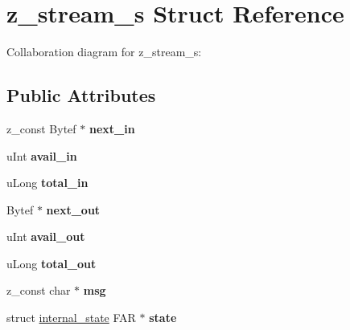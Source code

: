 \hypertarget{structz__stream__s}{\section{z\+\_\+stream\+\_\+s Struct Reference}
\label{structz__stream__s}
}


Collaboration diagram for z\+\_\+stream\+\_\+s\+:
\subsection*{Public Attributes}
\begin{DoxyCompactItemize}
\item 
\hypertarget{structz__stream__s_a1c9fd220f038a988fc6545262cb29802}{z\+\_\+const Bytef $\ast$ {\bfseries next\+\_\+in}}\label{structz__stream__s_a1c9fd220f038a988fc6545262cb29802}

\item 
\hypertarget{structz__stream__s_a0cf177f50dbb49692f27480cbcfde794}{u\+Int {\bfseries avail\+\_\+in}}\label{structz__stream__s_a0cf177f50dbb49692f27480cbcfde794}

\item 
\hypertarget{structz__stream__s_aa8f408b9632737dc21519fa1ed34b08d}{u\+Long {\bfseries total\+\_\+in}}\label{structz__stream__s_aa8f408b9632737dc21519fa1ed34b08d}

\item 
\hypertarget{structz__stream__s_a58f1e32c5e5e9860fc29267eab01c573}{Bytef $\ast$ {\bfseries next\+\_\+out}}\label{structz__stream__s_a58f1e32c5e5e9860fc29267eab01c573}

\item 
\hypertarget{structz__stream__s_a45ad2364307af9d944fd39d4eca3ca3c}{u\+Int {\bfseries avail\+\_\+out}}\label{structz__stream__s_a45ad2364307af9d944fd39d4eca3ca3c}

\item 
\hypertarget{structz__stream__s_abae26f1f236cf920250b9d37fdf009c1}{u\+Long {\bfseries total\+\_\+out}}\label{structz__stream__s_abae26f1f236cf920250b9d37fdf009c1}

\item 
\hypertarget{structz__stream__s_a6a453969266670bf40d83d156008084b}{z\+\_\+const char $\ast$ {\bfseries msg}}\label{structz__stream__s_a6a453969266670bf40d83d156008084b}

\item 
\hypertarget{structz__stream__s_acad0cbe87a267f2321e95f6bf7752af3}{struct \hyperlink{structinternal__state}{internal\+\_\+state} F\+A\+R $\ast$ {\bfseries state}}\label{structz__stream__s_acad0cbe87a267f2321e95f6bf7752af3}


\end{DoxyCompactItemize}

